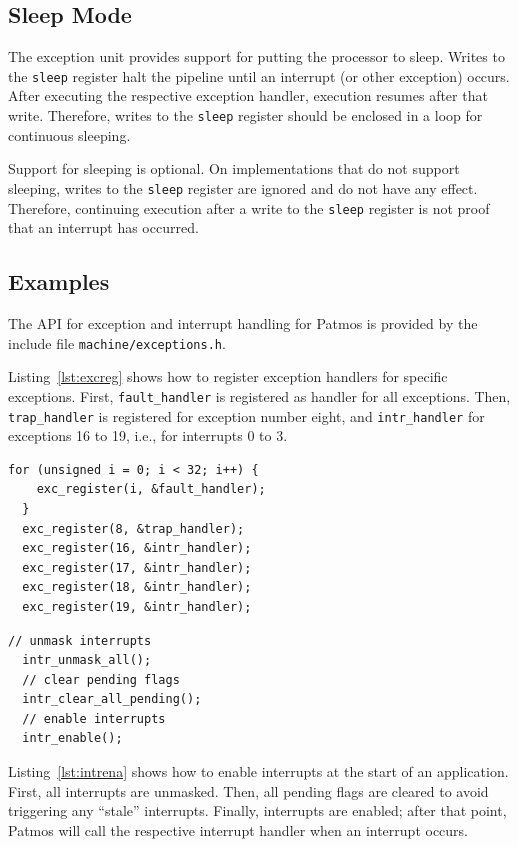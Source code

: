 \documentclass[a4paper,fontsize=10pt,twoside,DIV15,BCOR12mm,headinclude=true,footinclude=false,pagesize,bibtotoc]{scrbook}
\begin{document}
\subsection{Sleep Mode}

The exception unit provides support for putting the processor to
sleep. Writes to the \texttt{sleep} register halt the pipeline until
an interrupt (or other exception) occurs. After executing the
respective exception handler, execution resumes after that
write. Therefore, writes to the \texttt{sleep} register should be
enclosed in a loop for continuous sleeping.

Support for sleeping is optional. On implementations that do not
support sleeping, writes to the \texttt{sleep} register are ignored
and do not have any effect. Therefore, continuing execution after a
write to the \texttt{sleep} register is not proof that an interrupt
has occurred.

\subsection{Examples}

The API for exception and interrupt handling for Patmos is provided by
the include file \texttt{machine/exceptions.h}.

Listing~\ref{lst:excreg} shows how to register exception handlers for
specific exceptions. First, \texttt{fault\_handler} is registered as
handler for all exceptions. Then, \texttt{trap\_handler} is registered
for exception number eight, and \texttt{intr\_handler} for exceptions
16 to 19, i.e., for interrupts 0 to 3.

\begin{lstlisting}[float, caption={Exception handler registration\label{lst:excreg}}]
  for (unsigned i = 0; i < 32; i++) {
	exc_register(i, &fault_handler);
  }
  exc_register(8, &trap_handler);
  exc_register(16, &intr_handler);
  exc_register(17, &intr_handler);
  exc_register(18, &intr_handler);
  exc_register(19, &intr_handler);
\end{lstlisting}

\begin{lstlisting}[float, caption={Interrupt enabling\label{lst:intrena}}]
  // unmask interrupts
  intr_unmask_all();
  // clear pending flags
  intr_clear_all_pending();
  // enable interrupts
  intr_enable();
\end{lstlisting}

Listing~\ref{lst:intrena} shows how to enable interrupts at the start
of an application. First, all interrupts are unmasked. Then, all
pending flags are cleared to avoid triggering any ``stale''
interrupts. Finally, interrupts are enabled; after that point, Patmos
will call the respective interrupt handler when an interrupt occurs.
\end{document}
